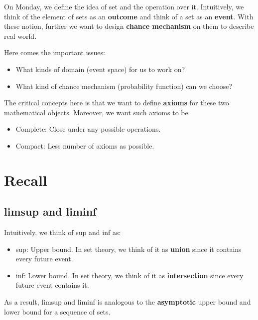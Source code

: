 \documentclass[Probability Theory.tex]{subfiles}
\begin{document}
On Monday, we define the idea of set and the operation over it. Intuitively, we think of the element of sets as an {\bf outcome} and think of a set as an {\bf event}. With these notion, further we want to design {\bf chance mechanism} on them to describe real world.

Here comes the important issues:
\begin{itemize}
	\item What kinds of domain (event space) for us to work on?
	\item What kind of chance mechanism (probability function) can we choose?
\end{itemize}
The critical concepts here is that we want to define {\bf axioms} for these two mathematical objects. Moreover, we want such axioms to be
\begin{itemize}
	\item Complete: Close under any possible operations.
	\item Compact: Less number of axioms as possible.
\end{itemize}

\section{Recall}
\subsection{limsup and liminf}
Intuitively, we think of sup and inf as:
\begin{itemize}
	\item sup: Upper bound. In set theory, we think of it as {\bf union} since it contains every future event.
	\item inf: Lower bound. In set theory, we think of it as {\bf intersection} since every future event contains it.
\end{itemize}
As a result, limsup and liminf is analogous to the {\bf asymptotic} upper bound and lower bound for a sequence of sets.
\end{document}
